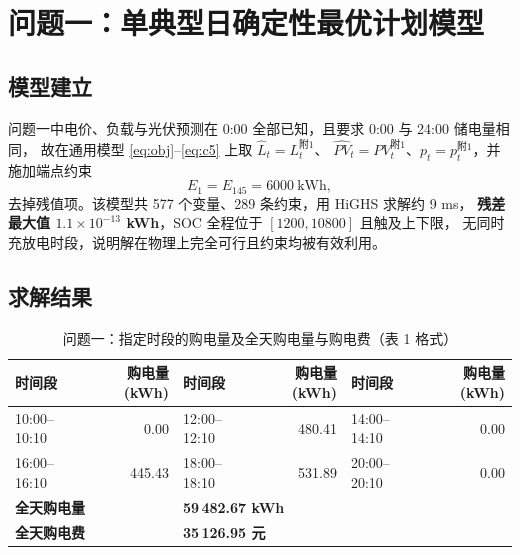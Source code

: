 \documentclass[12pt,a4paper,fontset=fandol]{ctexart}
\begin{document}
\section{问题一\nobreak：单典型日确定性最优计划模型}
\label{sec:q1}

\subsection{模型建立}

问题一中电价\nobreak、负载与光伏预测在 0:00 全部已知\nobreak，且要求 0:00 与 24:00 储电量相同\nobreak，
故在通用模型 \eqref{eq:obj}--\eqref{eq:c5} 上取 $\hat L_t=L_t^{\text{附1}}$\nobreak、
$\hat{PV}_t=PV_t^{\text{附1}}$\nobreak、$p_t=p_t^{\text{附1}}$\nobreak，并施加端点约束
\begin{equation}
E_1 = E_{145} = 6000\ \text{kWh},
\label{eq:q1end}
\end{equation}
去掉残值项\nobreak。该模型共 577 个变量\nobreak、289 条约束\nobreak，用 HiGHS 求解约 9 ms\nobreak，
\textbf{残差最大值 $1.1\times10^{-13}$ kWh}\nobreak，SOC 全程位于 $[1200,10800]$ 且触及上下限\nobreak，
无同时充放电时段\nobreak，说明解在物理上完全可行且约束均被有效利用\nobreak。

\subsection{求解结果}

\begin{table}[htbp]
\centering
\caption{问题一\nobreak：指定时段的购电量及全天购电量与购电费（表 1 格式\nobreak）}
\label{tab:q1a}
\begin{tabular}{@{}lrlrlr@{}}
\toprule
时间段 & 购电量(kWh) & 时间段 & 购电量(kWh) & 时间段 & 购电量(kWh) \\
\midrule
10:00--10:10 & 0.00 & 12:00--12:10 & 480.41 & 14:00--14:10 & 0.00 \\
16:00--16:10 & 445.43 & 18:00--18:10 & 531.89 & 20:00--20:10 & 0.00 \\
\multicolumn{2}{l}{\textbf{全天购电量}} & \multicolumn{4}{l}{\textbf{59\,482.67 kWh}} \\
\multicolumn{2}{l}{\textbf{全天购电费}} & \multicolumn{4}{l}{\textbf{35\,126.95 元}} \\
\bottomrule
\end{tabular}
\end{table}
\end{document}
